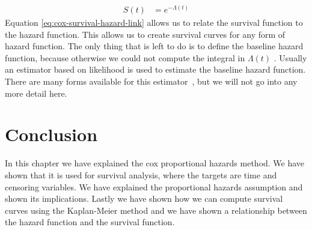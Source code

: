 \begin{equation}
\begin{split}
\label{eq:cox-survival-hazard-link}
S(t) &= e^{-\Lambda(t)}
\end{split}
\end{equation}
Equation \ref{eq:cox-survival-hazard-link} allows us to relate the survival function to the hazard function. This allows us to create survival curves for any form of hazard function. The only thing that is left to do is to define the baseline hazard function, because otherwise we could not compute the integral in $\Lambda(t)$ . Usually an estimator based on likelihood is used to estimate the baseline hazard function. There are many forms available for this estimator~\cite{royston2011estimating}, but we will not go into any more detail here.

\section{Conclusion}
\label{sec:cox-conclusion}
In this chapter we have explained the cox proportional hazards method. We have shown that it is used for survival analysis, where the targets are time and censoring variables. We have explained the proportional hazards assumption and shown its implications. Lastly we have shown how we can compute survival curves using the Kaplan-Meier method and we have shown a relationship between the hazard function and the survival function.
